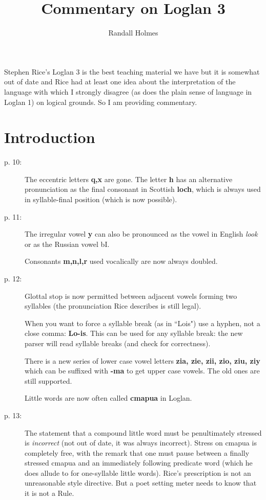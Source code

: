 \documentclass[12pt]{article}
\title{Commentary on Loglan 3}
\author{Randall Holmes}
\begin{document}
\maketitle

Stephen Rice's Loglan 3 is the best teaching material we have but it is somewhat out of date and Rice had at least one idea about the interpretation of the language with which I strongly disagree (as does the plain sense of language in Loglan 1) on logical grounds.  So I am providing commentary.

\section{Introduction}

\begin{description}

\item[p. 10:]  The eccentric letters {\bf q,x} are gone.  The letter {\bf h} has an alternative pronunciation as the final consonant in Scottish {\bf loch}, which is always used in syllable-final position (which is now possible).

\item[p. 11:] The irregular vowel {\bf y} can also be pronounced as the vowel in English {\em look\/} or as the Russian vowel bI.

Consonants {\bf m,n,l,r} used vocalically are now always doubled.

\item[p. 12:]  Glottal stop is now permitted between adjacent vowels forming two syllables (the pronunciation Rice describes is still legal).

When you want to force a syllable break (as in ``Lois") use a hyphen, not a close comma:  {\bf Lo-is}.  This can be used for any syllable break:  the new parser will read syllable breaks (and check for correctness).

There is a new series of lower case vowel letters {\bf zia, zie, zii, zio, ziu, ziy} which can be suffixed with {\bf -ma} to get upper case vowels.  The old ones are still supported.

Little words are now often called {\bf cmapua} in Loglan.

\item[p. 13:]  The statement that a compound little word must be penultimately stressed is {\em incorrect\/} (not out of date, it was always incorrect).  Stress on cmapua is completely free, with the remark that one must pause between a finally stressed cmapua and an immediately following predicate word (which he does allude to for one-syllable little words).  Rice's prescription is not an unreasonable style directive.  But a poet setting meter needs to know that it is not a Rule.


\end{description}
\end{document}
